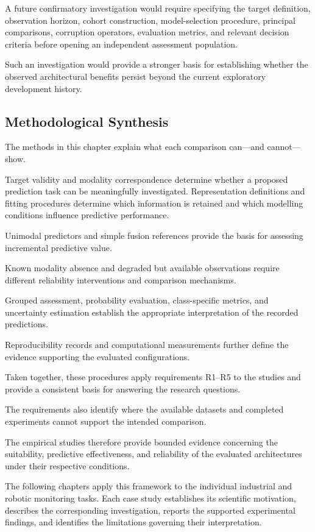 A future confirmatory investigation would require specifying the target definition, observation horizon, cohort construction, model-selection procedure, principal comparisons, corruption operators, evaluation metrics, and relevant decision criteria before opening an independent assessment population.

Such an investigation would provide a stronger basis for establishing whether the observed architectural benefits persist beyond the current exploratory development history.

\subsection{Methodological Synthesis}

The methods in this chapter explain what each comparison can—and cannot—show.

Target validity and modality correspondence determine whether a proposed prediction task can be meaningfully investigated. Representation definitions and fitting procedures determine which information is retained and which modelling conditions influence predictive performance.

Unimodal predictors and simple fusion references provide the basis for assessing incremental predictive value.

Known modality absence and degraded but available observations require different reliability interventions and comparison mechanisms.

Grouped assessment, probability evaluation, class-specific metrics, and uncertainty estimation establish the appropriate interpretation of the recorded predictions.

Reproducibility records and computational measurements further define the evidence supporting the evaluated configurations.

Taken together, these procedures apply requirements R1–R5 to the studies and provide a consistent basis for answering the research questions.

The requirements also identify where the available datasets and completed experiments cannot support the intended comparison.

The empirical studies therefore provide bounded evidence concerning the suitability, predictive effectiveness, and reliability of the evaluated architectures under their respective conditions.

\enlargethispage{\baselineskip}
The following chapters apply this framework to the individual industrial and robotic monitoring tasks. Each case study establishes its scientific motivation, describes the corresponding investigation, reports the supported experimental findings, and identifies the limitations governing their interpretation.
